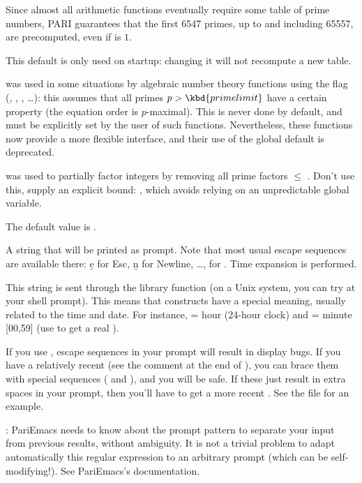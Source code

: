 {Since almost all arithmetic functions eventually require some table of prime
numbers, PARI guarantees that the first 6547 primes, up to and
including 65557, are precomputed, even if  is $1$.

This default is only used on startup: changing it will not recompute a new
table.

  was used in some
situations by algebraic number theory functions using the
 flag (, , , \dots):
this assumes that all primes $p > \kbd{primelimit}$ have a certain
property (the equation order is $p$-maximal). This is never done by default,
and must be explicitly set by the user of such functions. Nevertheless,
these functions now provide a more flexible interface, and their use
of the global default  is deprecated.

  was used to partially
factor integers by removing all prime factors $\leq$ .
Don't use this, supply an explicit bound: ,
which avoids relying on an unpredictable global variable.

The default value is .

\label{se:def,prompt}
A string that will be printed as
prompt. Note that most usual escape sequences are available there: \b{e} for
Esc, \b{n} for Newline, \dots, \kbd{\bs\bs} for \kbd{\bs}. Time expansion is
performed.

This string is sent through the library function  (on a
Unix system, you can try  at your shell prompt). This means
that \kbd{\%} constructs have a special meaning, usually related to the time
and date. For instance,  = hour (24-hour clock) and  =
minute [00,59] (use \kbd{\%\%} to get a real \kbd{\%}).

If you use , escape sequences in your prompt will result in
display bugs. If you have a relatively recent  (see the comment
at the end of ), you can brace them with special sequences
(\kbd{\bs[} and \kbd{\bs]}), and you will be safe. If these just result in
extra spaces in your prompt, then you'll have to get a more recent
. See the file  for an example.

: PariEmacs needs to know about the prompt pattern to
separate your input from previous  results, without ambiguity. It is
not a trivial problem to adapt automatically this regular expression to an
arbitrary prompt (which can be self-modifying!). See PariEmacs's
documentation.

}
